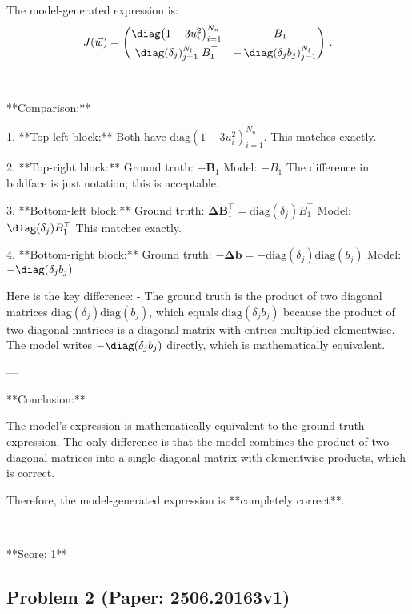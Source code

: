 \documentclass[10pt]{article}
\begin{document}
The model-generated expression is:
\[
J(\vec w)=
\begin{pmatrix}
\diag\bigl(1-3u_{i}^{2}\bigr)_{i=1}^{N_{n}} & -\,B_{1} \\[1ex]
\diag(\delta_{j})_{j=1}^{N_{l}}\;B_{1}^{\top} & -\,\diag(\delta_{j}b_{j})_{j=1}^{N_{l}}
\end{pmatrix}\,.
\]

---

**Comparison:**

1. **Top-left block:**  
Both have \(\text{diag}(1 - 3u_i^2)_{i=1}^{N_n}\). This matches exactly.

2. **Top-right block:**  
Ground truth: \(-\boldsymbol{B}_1\)  
Model: \(-B_1\)  
The difference in boldface is just notation; this is acceptable.

3. **Bottom-left block:**  
Ground truth: \(\boldsymbol{\Delta} \boldsymbol{B}_1^\top = \text{diag}(\delta_j) B_1^\top\)  
Model: \(\diag(\delta_j) B_1^\top\)  
This matches exactly.

4. **Bottom-right block:**  
Ground truth: \(-\boldsymbol{\Delta} \boldsymbol{b} = -\text{diag}(\delta_j) \text{diag}(b_j)\)  
Model: \(-\diag(\delta_j b_j)\)  

Here is the key difference:  
- The ground truth is the product of two diagonal matrices \(\text{diag}(\delta_j) \text{diag}(b_j)\), which equals \(\text{diag}(\delta_j b_j)\) because the product of two diagonal matrices is a diagonal matrix with entries multiplied elementwise.  
- The model writes \(-\diag(\delta_j b_j)\) directly, which is mathematically equivalent.

---

**Conclusion:**

The model's expression is mathematically equivalent to the ground truth expression. The only difference is that the model combines the product of two diagonal matrices into a single diagonal matrix with elementwise products, which is correct.

Therefore, the model-generated expression is **completely correct**.

---

**Score: 1**

\newpage
\subsection*{Problem 2 (Paper: 2506.20163v1)}
\end{document}
